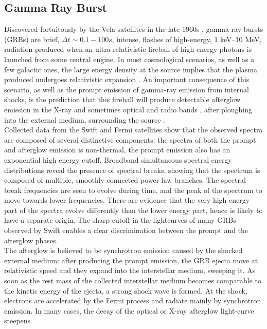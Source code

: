 \documentclass[binding=0.6cm, LaM]{sapthesis}
\begin{document}
\subsection{Gamma Ray Burst}

	Discovered fortuitously by the Vela satellites in the late 1960s \cite{180}, 
	gamma-ray bursts (GRBs) are brief, $\Delta t \sim 0.1-100s$, intense, flashes of high-energy, 1 keV–10 MeV, radiation 
	produced when an ultra-relativistic fireball of high energy photons is launched from some central engine. 
	In most cosmological scenarios, as well as a few galactic ones, 
	the large energy density at the source implies that the plasma produced 
	undergoes relativistic expansion \cite{181}.
	An important consequence of this scenario, as well as the prompt emission of gamma-ray emission from internal shocks, 
	is the prediction that this fireball will produce detectable afterglow emission in the X-ray and sometimes optical and radio bands \cite{182},	
	after ploughing into the external medium, surrounding the source \cite{153,162}. \\ 
	Collected data from the Swift and Fermi satellites show 
	that the observed spectra are composed of several distinctive components:
	the spectra of both the prompt and afterglow emission is non-thermal, 
	the prompt emission also has an exponential high energy cutoff.
	Broadband simultaneous spectral energy distributions  
	reveal the presence of spectral breaks, showing that the spectrum is composed of multiple, 
	smoothly connected power law branches. 
	The spectral break frequencies are seen to evolve during time, 
	and the peak of the spectrum to move towards lower frequencies. 
	There are evidence that the very high energy part of the spectra evolve differently than the lower energy part, 
	hence is likely to have a separate origin. 
	The sharp cutoff in the lightcurves of many GRBs observed by Swift enables a clear discrimination between the prompt and the afterglow phases.  \\
	The afterglow is believed to be synchrotron emission caused by the shocked external medium: after producing the prompt emission, the GRB ejecta move at relativistic speed 
	and they expand into the interstellar medium, sweeping it. 	
	As soon as the rest mass of the collected interstellar medium becomes comparable 
	to the kinetic energy of the ejecta, a strong shock wave is formed. 	
	At the shock, electrons are accelerated by the Fermi process and radiate mainly by synchrotron emission\cite{153,162}. 
	In many cases, the decay of the optical or X-ray afterglow light-curve steepens 
\end{document}
